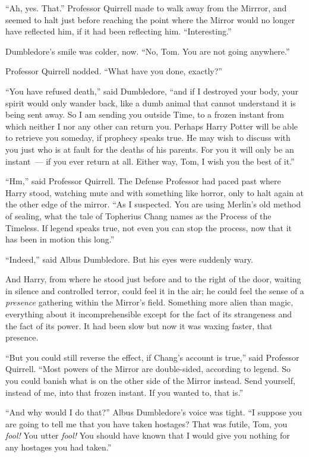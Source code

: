 ``Ah, yes. That.'' Professor Quirrell made to walk away from the Mirrror, and seemed to halt just before reaching the point where the Mirror would no longer have reflected him, if it had been reflecting him. ``Interesting.''

Dumbledore's smile was colder, now. ``No, Tom. You are not going anywhere.''

Professor Quirrell nodded. ``What have you done, exactly?''

``You have refused death,'' said Dumbledore, ``and if I destroyed your body, your spirit would only wander back, like a dumb animal that cannot understand it is being sent away. So I am sending you outside Time, to a frozen instant from which neither I nor any other can return you. Perhaps Harry Potter will be able to retrieve you someday, if prophecy speaks true. He may wish to discuss with you just who is at fault for the deaths of his parents. For you it will only be an instant~--- if you ever return at all. Either way, Tom, I wish you the best of it.''

``Hm,'' said Professor Quirrell. The Defense Professor had paced past where Harry stood, watching mute and with something like horror, only to halt again at the other edge of the mirror. ``As I suspected. You are using Merlin's old method of sealing, what the tale of Topherius Chang names as the Process of the Timeless. If legend speaks true, not even you can stop the process, now that it has been in motion this long.''

``Indeed,'' said Albus Dumbledore. But his eyes were suddenly wary.

And Harry, from where he stood just before and to the right of the door, waiting in silence and controlled terror, could feel it in the air; he could feel the sense of a \emph{presence} gathering within the Mirror's field. Something more alien than magic, everything about it incomprehensible except for the fact of its strangeness and the fact of its power. It had been slow but now it was waxing faster, that presence.

``But you could still reverse the effect, if Chang's account is true,'' said Professor Quirrell. ``Most powers of the Mirror are double-sided, according to legend. So you could banish what is on the other side of the Mirror instead. Send yourself, instead of me, into that frozen instant. If you wanted to, that is.''

``And why would I do that?'' Albus Dumbledore's voice was tight. ``I suppose you are going to tell me that you have taken hostages? That was futile, Tom, you \emph{fool!} You utter \emph{fool!} You should have known that I would give you nothing for any hostages you had taken.''

